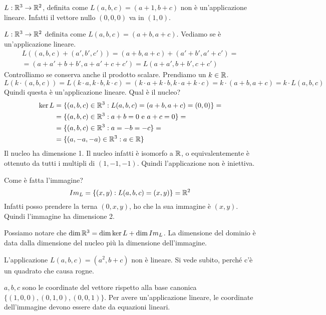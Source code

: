 \begin{exmp}
$L : \mathbb{R}^3 \to \mathbb{R}^2$, definita come $L(a,b,c) = (a+1, b+c)$ non \`e un'applicazione lineare. Infatti il vettore nullo $(0,0,0)$ va in $(1,0)$.

$L: \mathbb{R}^3 \to \mathbb{R}^2$ definita come $L(a,b,c) = (a + b, a + c)$. Vediamo se \`e un'applicazione lineare.
\begin{align*}
L \left( (a,b,c) + (a',b',c') \right) = (a+b,a+c) + (a' + b', a' + c') = \\ = (a + a' + b + b', a + a' + c + c') = L \left( a + a', b + b', c + c' \right)
\end{align*}
Controlliamo se conserva anche il prodotto scalare. Prendiamo un $k \in \mathbb{R}$.
\[
L \left( k \cdot (a,b,c) \right) = L \left( k \cdot a, k \cdot b, k \cdot c \right) = (k \cdot a + k \cdot b, k \cdot a + k \cdot c) = k \cdot (a + b, a + c) = k \cdot L(a, b, c)
\]
Quindi questa \`e un'applicazione lineare. Qual \`e il nucleo?
\begin{align*}
\ker L &= \{ (a,b,c) \in \mathbb{R}^3 : L(a,b,c) = (a + b, a +c) = (0, 0)\} = \\
&= \{ (a, b, c) \in \mathbb{R}^3 : a + b = 0 \text{ e } a + c = 0 \} = \\ 
&= \{ (a,b,c) \in \mathbb{R}^3 : a = -b = -c \} = \\
&= \{ (a, -a, -a) \in \mathbb{R}^3 : a \in \mathbb{R} \}
\end{align*}
Il nucleo ha dimensione 1. Il nucleo infatti \`e isomorfo a $\mathbb{R}$, o equivalentemente \`e ottenuto da tutti i multipli di $(1, -1, -1)$. Quindi l'applicazione non \`e iniettiva.

Come \`e fatta l'immagine?
\[
Im_{L} = \{ (x, y) : L(a,b,c) = (x,y) \} = \mathbb{R}^2
\]
Infatti posso prendere la terna $(0, x, y)$, ho che la sua immagine \`e $(x,y)$. Quindi l'immagine ha dimensione 2.

Possiamo notare che $\dim \mathbb{R}^3 = \dim \ker L + \dim Im_{L}$. La dimensione del dominio \`e data dalla dimensione del nucleo pi\`u la dimensione dell'immagine.

L'applicazione $L(a,b,c) = (a^2, b+c)$ non \`e lineare. Si vede subito, perch\'e c'\`e un quadrato che causa rogne.

$a,b,c$ sono le coordinate del vettore rispetto alla base canonica $\{ (1, 0, 0), (0, 1, 0), (0, 0, 1) \}$. Per avere un'applicazione lineare, le coordinate dell'immagine devono essere date da equazioni lineari.


\end{exmp}
